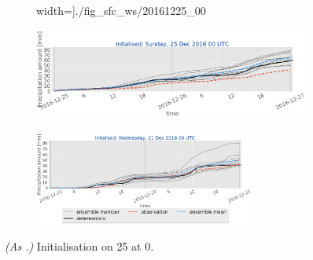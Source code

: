 \begin{figure}[H]
\begin{subfigure}[b]{0.9\textwidth}
		width=\textwidth]{./fig_sfc_ws/20161225_00}
		\caption{}\label{fig:res:sfc_ws25}
	\end{subfigure}
	\begin{subfigure}[b]{0.9\textwidth}
		\includegraphics[trim={0.cm 1.5cm 0cm 0cm},clip,
		width=\textwidth]{./fig_sfc_precip/20161225_00}
		\caption{}\label{fig:res:sfc_precip25}
	\end{subfigure}
	\begin{subfigure}[b]{\textwidth}
		\centering
		\includegraphics[trim={5.5cm 0cm 5.cm 17.7cm},clip,
		width=0.8\textwidth]{./fig_sfc_precip/20161221_00_label}
	\end{subfigure}
	\caption{\textit{(As .)} Initialisation on \SI{25}{\dec} at \SI{0}{\UTC}.}\label{fig:obs_meps:25}
\end{figure}
%

